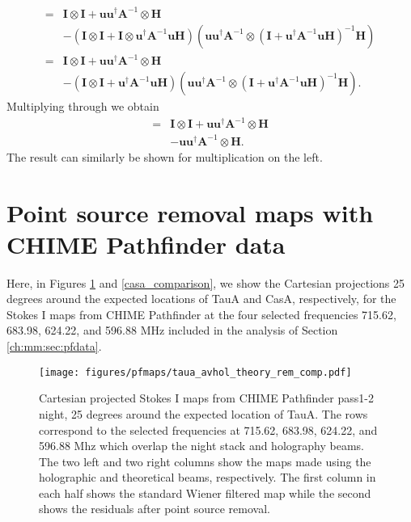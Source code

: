 \begin{align}
=& \mathbf{I} \otimes \mathbf{I} + \mathbf{u}\mathbf{u}^\dagger\mathbf{A}^{-1} \otimes \mathbf{H} 
\\ \nonumber &- \left( \mathbf{I} \otimes \mathbf{I} + \mathbf{I} \otimes \mathbf{u}^\dagger\mathbf{A}^{-1}\mathbf{u} \mathbf{H}\right)
 \left( \mathbf{u}\mathbf{u}^\dagger\mathbf{A}^{-1} \otimes \left(\mathbf{I} + \mathbf{u}^\dagger\mathbf{A}^{-1}\mathbf{u}\mathbf{H}\right)^{-1} \mathbf{H}\right)
\\ =& \mathbf{I} \otimes \mathbf{I} + \mathbf{u}\mathbf{u}^\dagger\mathbf{A}^{-1} \otimes \mathbf{H} 
\\ \nonumber &- \left( \mathbf{I} \otimes \mathbf{I} + \mathbf{u}^\dagger\mathbf{A}^{-1}\mathbf{u} \mathbf{H} \right)
 \left( \mathbf{u}\mathbf{u}^\dagger\mathbf{A}^{-1} \otimes \left(\mathbf{I} + \mathbf{u}^\dagger\mathbf{A}^{-1}\mathbf{u}\mathbf{H}\right)^{-1} \mathbf{H}\right).
 \end{align}
 Multiplying through we obtain
 \begin{align}
 =& \mathbf{I} \otimes \mathbf{I} + \mathbf{u}\mathbf{u}^\dagger\mathbf{A}^{-1} \otimes \mathbf{H} \nonumber 
\\ &- \mathbf{u}\mathbf{u}^\dagger\mathbf{A}^{-1} \otimes \mathbf{H}.
\end{align}
The result can similarly be shown for multiplication on the left.

\section{Point source removal maps with CHIME Pathfinder data}
\label{app:mm:sec:pfdata}

Here, in Figures \ref{taua_comparison}  and \ref{casa_comparison}, we show the Cartesian projections 25 degrees around the expected locations of TauA and CasA, respectively, for the Stokes I maps from CHIME Pathfinder at the four selected frequencies 715.62, 683.98, 624.22, and 596.88 MHz included in the analysis of Section \ref{ch:mm:sec:pfdata}.

\begin{figure}
\centering
\texttt{[image: figures/pfmaps/taua\_avhol\_theory\_rem\_comp.pdf]}
\caption{Cartesian projected Stokes I maps from CHIME Pathfinder pass1-2 night, 25 degrees around the expected location of TauA. The rows correspond to the selected frequencies at 715.62, 683.98, 624.22, and 596.88 Mhz which overlap the night stack and holography beams. The two left and two right columns show the maps made using the holographic and theoretical beams, respectively. The first column in each half shows the standard Wiener filtered map while the second shows the residuals after point source removal.}
\label{taua_comparison}
\end{figure}

